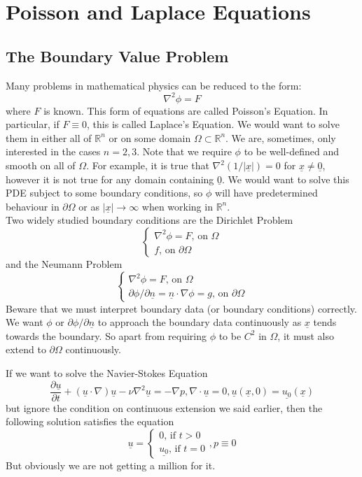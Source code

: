 \section{Poisson and Laplace Equations}
\subsection{The Boundary Value Problem}
Many problems in mathematical physics can be reduced to the form:
$$\nabla^2\phi=F$$
where $F$ is known.
This form of equations are called Poisson's Equation.
In particular, if $F\equiv 0$, this is called Laplace's Equation.
We would want to solve them in either all of $\mathbb R^n$ or on some domain $\Omega\subset\mathbb R^n$.
We are, sometimes, only interested in the cases $n=2,3$.
Note that we require $\phi$ to be well-defined and smooth on all of $\Omega$.
For example, it is true that $\nabla^2(1/|\underline{x}|)=0$ for $\underline{x}\neq\underline{0}$, however it is not true for any domain containing $\underline{0}$.
We would want to solve this PDE subject to some boundary conditions, so $\phi$ will have predetermined behaviour in $\partial\Omega$ or as $|\underline{x}|\to\infty$ when working in $\mathbb R^n$.\\
Two widely studied boundary conditions are the Dirichlet Problem
$$\begin{cases}
    \nabla^2\phi=F\text{, on $\Omega$}\\
    f\text{, on $\partial\Omega$}
\end{cases}$$
and the Neumann Problem
$$\begin{cases}
    \nabla^2\phi=F\text{, on $\Omega$}\\
    \partial\phi/\partial\underline{n}=\underline{n}\cdot\nabla\phi=g\text{, on $\partial\Omega$}
\end{cases}$$
Beware that we must interpret boundary data (or boundary conditions) correctly.
We want $\phi$ or $\partial\phi/\partial\underline{n}$ to approach the boundary data continuously as $\underline{x}$ tends towards the boundary.
So apart from requiring $\phi$ to be $C^2$ in $\Omega$, it must also extend to $\partial\Omega$ continuously.
\begin{example}
    If we want to solve the Navier-Stokes Equation
    $$\frac{\partial\underline{u}}{\partial t}+(\underline{u}\cdot\nabla)\underline{u}-\nu\nabla^2\underline{u}=-\nabla p,\nabla\cdot\underline{u}=0,\underline{u}(\underline{x},0)=\underline{u_0}(\underline{x})$$
    but ignore the condition on continuous extension we said earlier, then the following solution satisfies the equation
    $$\underline{u}=\begin{cases}
        0\text{, if $t>0$}\\
        \underline{u_0}\text{, if $t=0$}
    \end{cases},p\equiv 0$$
    But obviously we are not getting a million for it.
\end{example}
